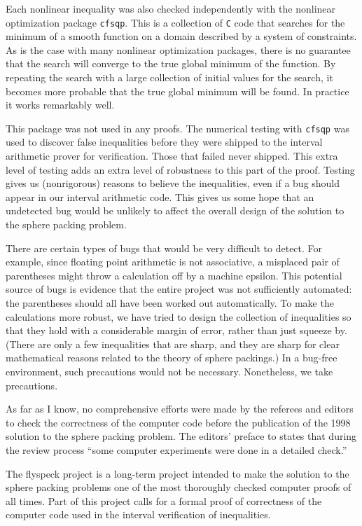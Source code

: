 Each nonlinear inequality was also checked independently with the nonlinear
optimization package {\tt cfsqp}.  This is a collection of {\tt C} code
that searches for the minimum of a smooth function on a domain described
by a system of constraints.  As is the case with many nonlinear optimization
packages, there is no guarantee that the search will converge to
the true global minimum of the function.   By repeating the search
with a large collection of initial values for the search, it becomes
more probable that the true global minimum will be found.
In practice it works remarkably well.

This package was not used
in any proofs.  The numerical testing with {\tt cfsqp} was used to
discover false inequalities before they were shipped to the interval
arithmetic prover for verification.  Those that failed never shipped.
This extra level of testing adds an extra level of robustness to
this part of the proof.  Testing gives us (nonrigorous)
reasons to believe the inequalities, even if a bug should appear in
our interval arithmetic code.  This gives us some hope that an undetected bug
would be unlikely to affect the overall design of the solution to
the sphere packing problem.


There are certain types of bugs that would be very difficult to detect.
For example, since floating point arithmetic is not associative, a
misplaced pair of parentheses might throw a calculation off by a
machine epsilon.  
This potential source of bugs is evidence that the entire project 
was not sufficiently
automated:  the parentheses should all have been worked out automatically.
To make the calculations more robust, we have tried
to design the collection of inequalities so that they hold with a considerable
margin of error, rather than just squeeze by.  (There are only a few
inequalities that are sharp, and they are sharp for clear mathematical
reasons related to the theory of sphere packings.)  In a bug-free environment,
such precautions would not be necessary.  Nonetheless, we take precautions.

As far as I know, no comprehensive efforts were made by the referees and
editors to check the correctness of the computer code before the
publication of the 1998 solution to the sphere packing problem.  The editors' preface
to \cite{DCG} states that during the review process
``some computer experiments were done in a detailed check.''


The flyspeck project is a long-term project intended to make the solution
to the sphere packing problems one of the most thoroughly checked computer
proofs of all times.  Part of this project calls for a formal proof of correctness of the
computer code used in the interval verification of inequalities.

